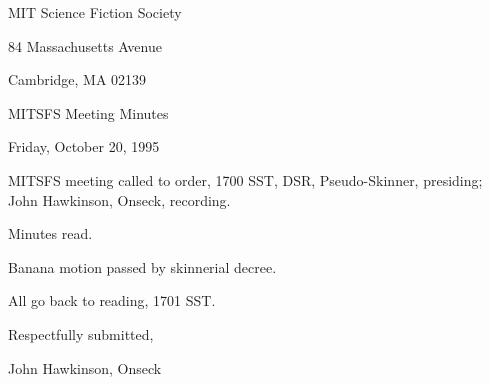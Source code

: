 \documentclass[12pt]{article}
\begin{document}
\begin{center}

MIT Science Fiction Society 

84 Massachusetts Avenue

Cambridge, MA 02139

\vspace{12pt}

MITSFS Meeting Minutes 

Friday, October 20, 1995

\end{center}
 
\vspace{18pt}

\setlength{\parskip}{6pt}

\noindent
MITSFS meeting called to order, 1700 SST,
DSR, Pseudo-Skinner, presiding; John Hawkinson, Onseck, recording.

Minutes read.

Banana motion passed by skinnerial decree.

\vspace{12pt}

\noindent
All go back to reading, 1701 SST.

\vspace{18pt}

\centerline{Respectfully submitted,}
\centerline{John Hawkinson, Onseck}
\end{document}
